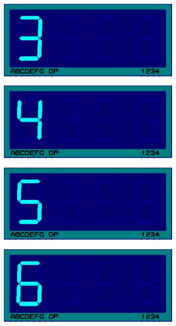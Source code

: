 \documentclass{lab_sheet}
\begin{document}
\begin{figure}[H]
\begin{subfigure}{.33\textwidth}
  \centering
  \includegraphics[frame,width=.9\linewidth]{../Figures/s3}     
  \caption{}
  \label{fig:prob1-d}
\end{subfigure}
\begin{subfigure}{.33\textwidth}
  \centering
  \includegraphics[frame,width=.9\linewidth]{../Figures/s4}   
  \caption{}
  \label{fig:prob1-e}
\end{subfigure}
\begin{subfigure}{.33\textwidth}
  \centering
  \includegraphics[frame,width=.9\linewidth]{../Figures/s5}   
  \caption{}
  \label{fig:prob1-f}
\end{subfigure}
\newline
\begin{subfigure}{.33\textwidth}
    \centering
    \includegraphics[frame,width=.9\linewidth]{../Figures/s6}   

\end{subfigure}
\end{figure}
\end{document}
